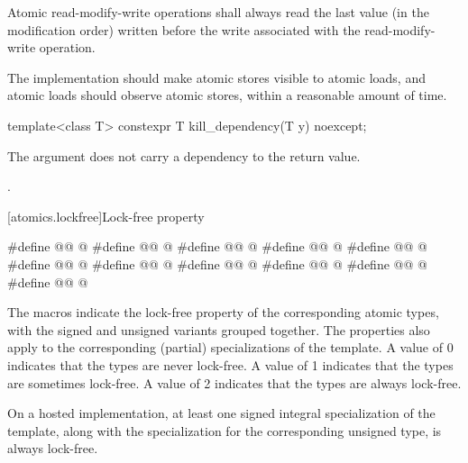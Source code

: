 \pnum
Atomic read-modify-write operations shall always read the last value
(in the modification order) written before the write associated with
the read-modify-write operation.

\pnum
\recommended
The implementation should make atomic stores visible to atomic loads,
and atomic loads should observe atomic stores,
within a reasonable amount of time.

%
\begin{itemdecl}
template<class T>
  constexpr T kill_dependency(T y) noexcept;
\end{itemdecl}

\begin{itemdescr}
\pnum
\effects
The argument does not carry a dependency to the return
value.

\pnum
\returns
{}.
\end{itemdescr}


[atomics.lockfree]{Lock-free property}

\begin{codeblock}
#define @@ @\unspec@
#define @@ @\unspec@
#define @@ @\unspec@
#define @@ @\unspec@
#define @@ @\unspec@
#define @@ @\unspec@
#define @@ @\unspec@
#define @@ @\unspec@
#define @@ @\unspec@
#define @@ @\unspec@
#define @@ @\unspec@
\end{codeblock}

\pnum
The  macros indicate the lock-free property of the
corresponding atomic types, with the signed and unsigned variants grouped
together. The properties also apply to the corresponding (partial) specializations of the
 template. A value of 0 indicates that the types are never
lock-free. A value of 1 indicates that the types are sometimes lock-free. A
value of 2 indicates that the types are always lock-free.

\pnum
On a hosted implementation,
at least one signed integral specialization of the  template,
along with the specialization
for the corresponding unsigned type,
is always lock-free.

